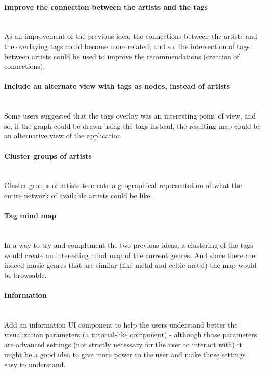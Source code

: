   \paragraph*{Improve the connection between the artists and the tags} \hfill \\
  \indent As an improvement of the previous idea, the connections between the artists and the overlaying tags could become more related, and so, the intersection of tags between artists could be used to improve the recommendations (creation of connections). 

  \paragraph*{Include an alternate view with tags as nodes, instead of artists} \hfill \\
  \indent Some users suggested that the tags overlay was an interesting point of view, and so, if the graph could be drawn using the tags instead, the resulting map could be an alternative view of the application.

  \paragraph*{Cluster groups of artists} \hfill \\
  \indent Cluster groups of artists to create a geographical representation of what the entire network of available artists could be like.

  \paragraph*{Tag mind map} \hfill \\
  \indent In a way to try and complement the two previous ideas, a clustering of the tags would create an interesting mind map of the current genres.
  And since there are indeed music genres that are similar (like metal and celtic metal) the map would be browsable.

  \paragraph*{Information} \hfill \\
  \indent Add an information UI component to help the users understand better the visualization parameters (a tutorial-like component) - although those parameters are advanced settings (not strictly necessary for the user to interact with) it might be a good idea to give more power to the user and make these settings easy to understand.

